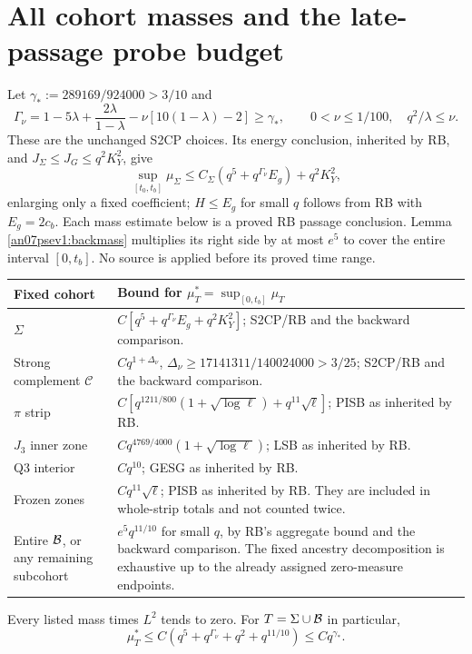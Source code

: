 \documentclass[11pt]{article}
\numberwithin{equation}{section}
\theoremstyle{remark}\newtheorem{remark}[theorem]{Remark}
\newcommand{\CC}{\mathcal C}\newcommand{\Gp}{{G_+}}
\begin{document}
\section{All cohort masses and the late-passage probe budget}
\label{an07psev1:budgets}
Let \(\gamma_*:=289169/924000>3/10\) and
\[
 \Gamma_\nu=1-5\lambda+\frac{2\lambda}{1-\lambda}
                   -\nu[10(1-\lambda)-2]\ge\gamma_*,
 \qquad 0<\nu\le1/100,\quad q^2/\lambda\le\nu .
 \]
These are the unchanged S2CP choices. Its energy conclusion,
inherited by RB, and \(J_\Sigma\le J_G\le q^2K_Y^2\), give
\[
 \sup_{[t_0,t_b]}\mu_\Sigma
 \le C_\Sigma(q^5+q^{\Gamma_\nu}E_g)+q^2K_Y^2 ,
 \]
enlarging only a fixed coefficient; \(H\le E_g\) for small
\(q\) follows from RB with \(E_g=2c_b\).
Each mass estimate below is a proved RB passage conclusion.
Lemma \ref{an07psev1:backmass} multiplies its right side
by at most \(e^5\) to cover the entire interval \([0,t_b]\).
No source is applied before its proved time range.
\small
\begin{longtable}{>{\raggedright\arraybackslash}p{}
 >{\raggedright\arraybackslash}p{}}
\toprule Fixed cohort & Bound for \(\mu_T^*=\sup_{[0,t_b]}\mu_T\)\\\midrule\endhead
\(\Sigma\) & \(C[q^5+q^{\Gamma_\nu}E_g+q^2K_Y^2]\);
 S2CP/RB and the backward comparison.\\
Strong complement \(\CC\) & \(Cq^{1+\Delta_\nu}\),
 \(\Delta_\nu\ge17141311/140024000>3/25\);
 S2CP/RB and the backward comparison.\\
\(\pi\) strip & \(C[q^{1211/800}(1+\sqrt{\log\ell})
                          +q^{11}\sqrt\ell]\);
 PISB as inherited by RB.\\
\(J_3\) inner zone & \(Cq^{4769/4000}(1+\sqrt{\log\ell})\);
 LSB as inherited by RB.\\
Q3 interior & \(Cq^{10}\); GESG as inherited by RB.\\
Frozen zones & \(Cq^{11}\sqrt\ell\); PISB as inherited by RB.
 They are included in whole-strip totals and not counted twice.\\
Entire \(\mathcal B\), or any remaining subcohort & \(e^5q^{11/10}\)
 for small \(q\), by RB's aggregate bound and the backward
 comparison. The fixed ancestry decomposition is exhaustive
 up to the already assigned zero-measure endpoints.\\\bottomrule
\end{longtable}\normalsize
Every listed mass times \(L^2\) tends to zero. For
\(T=\Sigma\cup\mathcal B\) in particular,
\begin{equation}
 \mu_T^*\le C(q^5+q^{\Gamma_\nu}+q^2+q^{11/10})
                 \le Cq^{\gamma_*}.
 \label{an07psev1:totalmass}
\end{equation}
\end{document}
